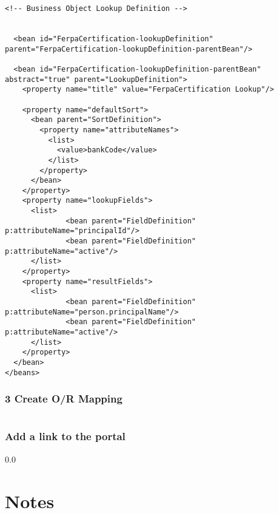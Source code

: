 \begin{verbatim}
<!-- Business Object Lookup Definition -->


  <bean id="FerpaCertification-lookupDefinition" parent="FerpaCertification-lookupDefinition-parentBean"/>

  <bean id="FerpaCertification-lookupDefinition-parentBean" abstract="true" parent="LookupDefinition">
    <property name="title" value="FerpaCertification Lookup"/>
    
    <property name="defaultSort">
      <bean parent="SortDefinition">
        <property name="attributeNames">
          <list>
            <value>bankCode</value>
          </list>
        </property>
      </bean>
    </property>
    <property name="lookupFields">
      <list>
              <bean parent="FieldDefinition" p:attributeName="principalId"/>
              <bean parent="FieldDefinition" p:attributeName="active"/>
      </list>
    </property>
    <property name="resultFields">
      <list>
              <bean parent="FieldDefinition" p:attributeName="person.principalName"/>
              <bean parent="FieldDefinition" p:attributeName="active"/>
      </list>
    </property>
  </bean>
</beans>\end{verbatim}

\subsubsection*{3 Create O/R Mapping}

\begin{verbatim}
\end{verbatim}

\subsubsection*{Add a link to the portal}

\newpage
{\setlength{\baselineskip}%
  {0.0\baselineskip}
  \section*{Notes}
  \hrulefill \par}